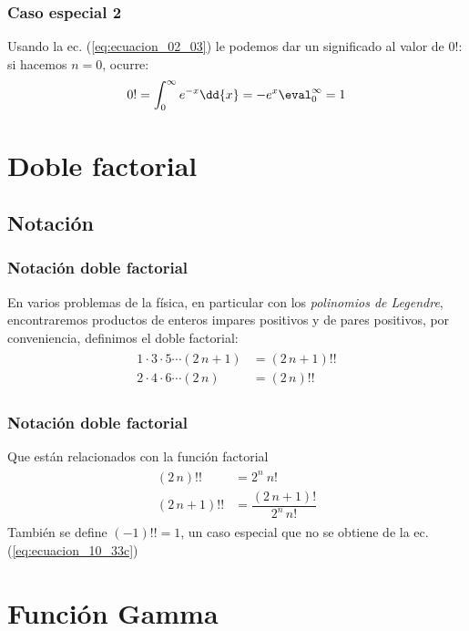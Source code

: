 \begin{frame}
\frametitle{Caso especial 2}
Usando la ec. (\ref{eq:ecuacion_02_03}) le podemos dar un significado al valor de $0!$: si hacemos $n = 0$, ocurre:
\begin{align}
0! = \int_{0}^{\infty} e^{-x} \dd{x} = -e^{x}\eval_{0}^{\infty} = 1
\label{eq:ecuacion_02_04}
\end{align}
\end{frame}
\section{Doble factorial}
\subsection{Notación}
\begin{frame}
\frametitle{Notación doble factorial}
En varios problemas de la física, en particular con los \emph{polinomios de Legendre}, encontraremos productos de enteros impares positivos y de pares positivos, por conveniencia, definimos el doble factorial:
\begin{align}
\begin{aligned}
1 \cdot 3 \cdot 5 \cdots (2 \, n+1) &= (2 \, n+1) !! \\
2 \cdot 4 \cdot 6 \cdots (2 \, n) &= (2 \, n) !!
\end{aligned}
\label{eq:ecuacion_10_33b}
\end{align}
\end{frame}
\begin{frame}
\frametitle{Notación doble factorial}
Que están relacionados con la función factorial
\begin{align}
\begin{aligned}
(2 \, n)!! &=  2^{n} \: n! \\[1em]
(2 \, n+1)!! &= \dfrac{(2 \, n+1)!}{2^{n} \, n!}
\end{aligned}
\label{eq:ecuacion_10_33c}
\end{align}
También se define $(-1)!! = 1$, un caso especial que no se obtiene de la ec. (\ref{eq:ecuacion_10_33c})
\end{frame}
\section{Función Gamma}
